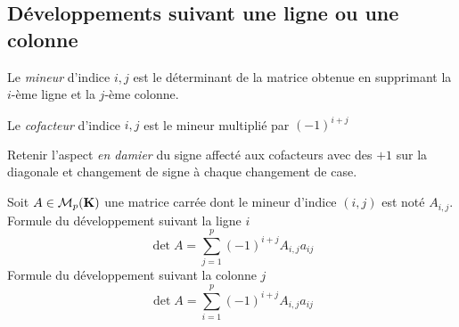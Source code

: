 \subsection{Développements suivant une ligne ou une colonne}
\begin{defi}
 \begin{description}
 \item 
\end{description}
\item {} Le \emph{mineur} d'indice $i,j$ est le déterminant de la matrice obtenue en supprimant la $i$-ème ligne et la $j$-ème colonne.
\item {} Le \emph{cofacteur} d'indice $i,j$ est le mineur multiplié par $(-1)^{i+j}$
\end{defi}
Retenir l'aspect \emph{en damier} du signe affecté aux cofacteurs avec des $+1$ sur la diagonale et changement de signe à chaque changement de case.
\begin{propn}
Soit $A\in \mathcal M_p(\mathbf{K})$ une matrice carrée dont le mineur d'indice $(i,j)$ est noté $A_{i,j}$.\newline
Formule du développement suivant la ligne $i$
 \begin{displaymath}
 \det A = \sum_{j=1}^p (-1)^{i+j}A_{i,j}a_{ij}
\end{displaymath}
Formule du développement suivant la colonne $j$
 \begin{displaymath}
 \det A = \sum_{i=1}^p (-1)^{i+j}A_{i,j}a_{ij}
\end{displaymath}
\end{propn}

